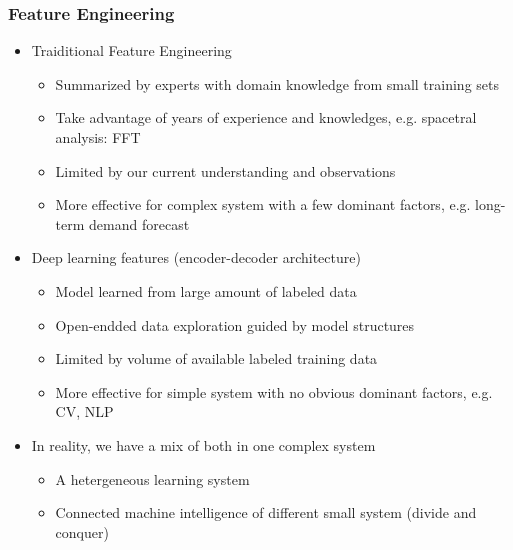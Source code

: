 \documentclass[aspectratio=169,xcolor=x11names,table]{beamer}
\begin{document}
\begin{frame}
	\frametitle{Feature Engineering}
	\begin{itemize}
		\item<1> Traiditional Feature Engineering
			\begin{itemize}
				\item Summarized by experts with domain knowledge from small training sets
				\item Take advantage of years of experience and knowledges, e.g. spacetral analysis: FFT
				\item Limited by our current understanding and observations
				\item More effective for complex system with a few dominant factors, e.g. long-term demand forecast
			\end{itemize}
		\item<2> Deep learning features (encoder-decoder architecture)
			\begin{itemize}
				\item Model learned from large amount of labeled data
				\item Open-endded data exploration guided by model structures
				\item Limited by volume of available labeled training data
				\item More effective for simple system with no obvious dominant factors, e.g. CV, NLP
			\end{itemize}
		\item<3> In reality, we have a mix of both in one complex system
			\begin{itemize}
				\item A hetergeneous learning system
				\item Connected machine intelligence of different small system (divide and conquer)
			\end{itemize}
	\end{itemize}
\end{frame}
\end{document}
